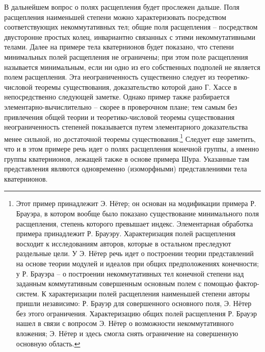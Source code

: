 \documentclass[11pt]{article}
\begin{document}
\setcounter{footnote}{0}

\noindent В дальнейшем вопрос о полях расщепления будет прослежен дальше. Поля расщепления наименьшей степени можно характеризовать посредством соответствующих некоммутативных тел; общие поля расщепления -- посредством двусторонне простых колец, инвариантно связанных с этими некоммутативными телами. Далее на примере тела кватернионов будет показано, что степени минимальных полей расщепления не ограничены; при этом поле расщепления называется минимальным, если ни одно из его собственных подполей не является полем расщепления. Эта неограниченность существенно следует из теоретико-числовой теоремы существования, доказательство которой дано Г. Хассе в непосредственно следующей заметке. Однако пример также разбирается элементарно-вычислительно -- скорее в проверочном плане; тем самым без привлечения общей теории и теоретико-числовой теоремы существования неограниченность степеней показывается путем элементарного доказательства менее сильной, но достаточной теоремы существования.\footnote{Этот пример принадлежит Э. Нётер; он основан на модификации примера Р. Брауэра, в котором вообще было показано существование минимального поля расщепления, степень которого превышает индекс. Элементарная обработка примера принадлежит Р. Брауэру. Характеризация полей расщепления восходит к исследованиям авторов, которые в остальном преследуют раздельные цели. У Э. Нётер речь идет о построении теории представлений на основе теории модулей и идеалов при общих предположениях конечности; у Р. Брауэра -- о построении некоммутативных тел конечной степени над заданным коммутативным совершенным основным полем с помощью фактор-систем. К характеризации полей расщепления наименьшей степени авторы пришли независимо: Р. Брауэр для совершенного основного поля, Э. Нётер без этого ограничения. Характеризацию общих полей расщепления Р. Брауэр нашел в связи с вопросом Э. Нётер о возможности некоммутативного вложения; Э. Нётер и здесь смогла снять ограничение на совершенную основную область.} Следует еще заметить, что и в этом примере речь идет о полях расщепления конечной группы, а именно группы кватернионов, лежащей также в основе примера Шура. Указанные там представления являются одновременно (изоморфными) представлениями тела кватернионов.
\end{document}
